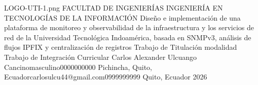 \documentclass[12pt,a4paper,oneside]{report}
\begin{document}
\UTIPortada
{LOGO-UTI-1.png} %
{FACULTAD DE INGENIERÍAS} %
{INGENIERÍA EN TECNOLOGÍAS DE LA INFORMACIÓN} %
{Diseño e implementación de una plataforma de monitoreo y observabilidad de la infraestructura y los servicios de red de la Universidad Tecnológica Indoamérica, basada en SNMPv3, análisis de flujos IPFIX y centralización de registros} %
{Trabajo de Titulación modalidad Trabajo de Integración Curricular} %
{\UTIDatosAutores
  {Carlos Alexander Ulcuango Cancino}{masculino}{0000000000}
  {Pichincha, Quito, Ecuador}{carlosulcu44@gmail.com}{0999999999}} %
{} %
{Quito, Ecuador} %
{2026} %

\UTIFrontMatter


















\UTIMainMatter








\UTIAppendixMatter


\end{document}
